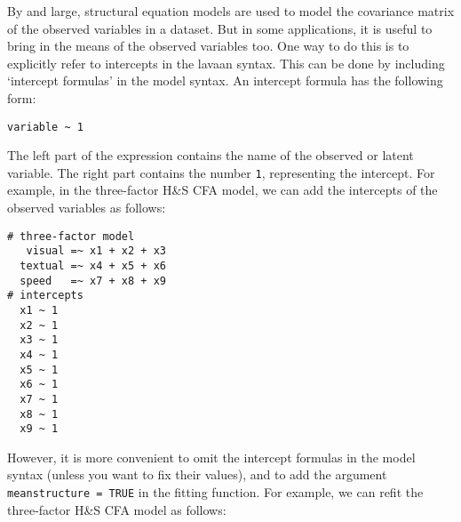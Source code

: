 By and large, structural equation models are used to model the
covariance matrix of the observed variables in a dataset. But in some
applications, it is useful to bring in the means of the observed
variables too. One way to do this is to explicitly refer to intercepts
in the lavaan syntax. This can be done by including `intercept formulas'
in the model syntax. An intercept formula has the following form:

\begin{verbatim}
variable ~ 1
\end{verbatim}

The left part of the expression contains the name of the observed or
latent variable. The right part contains the number \texttt{1},
representing the intercept. For example, in the three-factor H\&S CFA
model, we can add the intercepts of the observed variables as follows:

\begin{verbatim}
# three-factor model
   visual =~ x1 + x2 + x3
  textual =~ x4 + x5 + x6
  speed   =~ x7 + x8 + x9
# intercepts
  x1 ~ 1
  x2 ~ 1
  x3 ~ 1
  x4 ~ 1
  x5 ~ 1
  x6 ~ 1
  x7 ~ 1
  x8 ~ 1
  x9 ~ 1
\end{verbatim}

However, it is more convenient to omit the intercept formulas in the
model syntax (unless you want to fix their values), and to add the
argument \texttt{meanstructure = TRUE} in the fitting function. For
example, we can refit the three-factor H\&S CFA model as follows:

\begin{Shaded}
\begin{Highlighting}[]
\StringTok{ }
            
            \NormalTok{)}
\end{Highlighting}
\end{Shaded}

